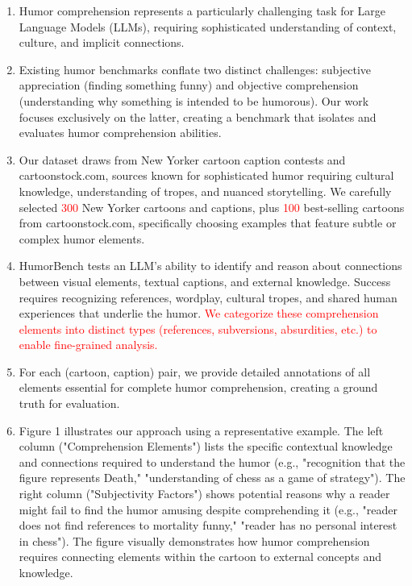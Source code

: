 \documentclass[11pt]{article}
\begin{document}
\begin{enumerate}
\item Humor comprehension represents a particularly challenging task for Large Language Models (LLMs), requiring sophisticated understanding of context, culture, and implicit connections.

\item Existing humor benchmarks conflate two distinct challenges: subjective appreciation (finding something funny) and objective comprehension (understanding why something is intended to be humorous). Our work focuses exclusively on the latter, creating a benchmark that isolates and evaluates humor comprehension abilities.

\item Our dataset draws from New Yorker cartoon caption contests and cartoonstock.com, sources known for sophisticated humor requiring cultural knowledge, understanding of tropes, and nuanced storytelling. We carefully selected \textcolor{red}{300} New Yorker cartoons and captions, plus \textcolor{red}{100} best-selling cartoons from cartoonstock.com, specifically choosing examples that feature subtle or complex humor elements.

\item HumorBench tests an LLM's ability to identify and reason about connections between visual elements, textual captions, and external knowledge. Success requires recognizing references, wordplay, cultural tropes, and shared human experiences that underlie the humor. \textcolor{red}{We categorize these comprehension elements into distinct types (references, subversions, absurdities, etc.) to enable fine-grained analysis.}

\item For each (cartoon, caption) pair, we provide detailed annotations of all elements essential for complete humor comprehension, creating a ground truth for evaluation.

\item Figure 1 illustrates our approach using a representative example. The left column ("Comprehension Elements") lists the specific contextual knowledge and connections required to understand the humor (e.g., "recognition that the figure represents Death," "understanding of chess as a game of strategy"). The right column ("Subjectivity Factors") shows potential reasons why a reader might fail to find the humor amusing despite comprehending it (e.g., "reader does not find references to mortality funny," "reader has no personal interest in chess"). The figure visually demonstrates how humor comprehension requires connecting elements within the cartoon to external concepts and knowledge.


\end{enumerate}
\end{document}
